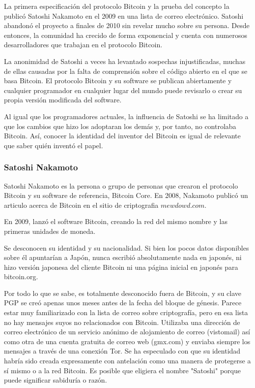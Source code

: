 \documentclass[12pt,letterpaper]{article}
\begin{document}
 La primera especificaci\'on del protocolo Bitcoin y la prueba del concepto la public\'o Satoshi Nakamoto en el 2009 en una lista de correo electr\'onico. Satoshi abandon\'o el proyecto a finales de 2010 sin revelar mucho sobre su persona. Desde entonces, la comunidad ha crecido de forma exponencial y cuenta con numerosos desarrolladores que trabajan en el protocolo Bitcoin.

La anonimidad de Satoshi a veces ha levantado sospechas injustificadas, muchas de ellas causadas por la falta de comprensi\'on sobre el c\'odigo abierto en el que se basa Bitcoin. El protocolo Bitcoin y su software se publican abiertamente y cualquier programador en cualquier lugar del mundo puede revisarlo o crear su propia versi\'on modificada del software. 

Al igual que los programadores actuales, la influencia de Satoshi se ha limitado a que los cambios que hizo los adoptaran los dem\'as y, por tanto, no controlaba Bitcoin. As\'i, conocer la identidad del inventor del Bitcoin es igual de relevante que saber qui\'en invent\'o el papel.
            
                \subsubsection*{Satoshi Nakamoto}
Satoshi Nakamoto es la persona o grupo de personas que crearon el protocolo Bitcoin y su software de referencia, Bitcoin Core. 
En 2008, Nakamoto public\'o un articulo acerca de Bitcoin en el sitio de criptografia $mewdowd.com$. 

En 2009, lanz\'o el software Bitcoin, creando la red del mismo nombre y las primeras unidades de moneda.

Se desconocen su identidad y su nacionalidad. Si bien los pocos datos disponibles sobre \'el apuntar\'ian a Jap\'on, nunca escribi\'o absolutamente nada en japon\'es, ni hizo versi\'on japonesa del cliente Bitcoin ni una p\'agina inicial en japon\'es para bitcoin.org.

Por todo lo que se sabe, es totalmente desconocido fuera de Bitcoin, y su clave PGP se cre\'o apenas unos meses antes de la fecha del bloque de g\'enesis. Parece estar muy familiarizado con la lista de correo sobre criptograf\'ia, pero en esa lista no hay mensajes suyos no relacionados con Bitcoin. Utilizaba una direcci\'on de correo electr\'onico de un servicio an\'onimo de alojamiento de correo (vistomail) as\'i como otra de una cuenta gratuita de correo web (gmx.com) y enviaba siempre los mensajes a trav\'es de una conexi\'on Tor. Se ha especulado con que su identidad habr\'ia sido creada expresamente con antelaci\'on como una manera de protegerse a s\'i mismo o a la red Bitcoin. Es posible que eligiera el nombre "Satoshi" porque puede significar sabidur\'ia o raz\'on. 
\end{document}
